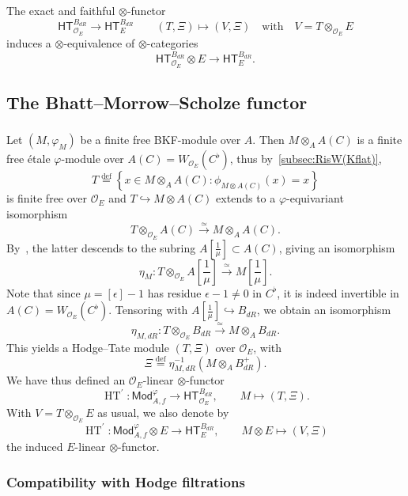 \documentclass[11pt]{article}
\theoremstyle{definition}
\numberwithin{equation}{section}
\numberwithin{figure}{section}
\numberwithin{table}{section}
\newcommand{\Mod}{\mathsf{Mod}}
\newcommand{\HT}{\mathsf{HT}}
\DeclareMathOperator{\HTT}{HT}
\newcommand{\eqd}{\stackrel{\mathrm{def}}{=}}
\newcommand*{\dR}{dR}
\begin{document}
The exact and faithful $\otimes$-functor
\[
\HT_{\mathcal{O}_{E}}^{B_{\dR}}\rightarrow\HT_{E}^{B_{\dR}}\qquad(T,\Xi)\mapsto(V,\Xi)\quad\text{with}\quad V=T\otimes_{\mathcal{O}_{E}}E
\]
induces a $\otimes$-equivalence of $\otimes$-categories
\[
\HT_{\mathcal{O}_{E}}^{B_{\dR}}\otimes E\rightarrow\HT_{E}^{B_{\dR}}.
\]


\subsection{The Bhatt--Morrow--Scholze functor}\label{subsec:The-Bhatt--Morrow--Scholze-functor}

\subsubsection{}

Let $(M,\varphi_{M})$ be a finite free BKF-module over $A$. Then $M\otimes_{A}A(C)$ is a finite free \'etale $\varphi$-module over $A(C)=W_{\mathcal{O}_{E}}(C^{\flat})$, thus by~\ref{subsec:RisW(Kflat)},
\[
T\eqd\left\{ x\in M\otimes_{A}A(C):\phi_{M\otimes A(C)}(x)=x\right\}
\]
is finite free over $\mathcal{O}_{E}$ and $T\hookrightarrow M\otimes A(C)$ extends to a $\varphi$-equivariant isomorphism
\[
T\otimes_{\mathcal{O}_{E}}A(C)\stackrel{\simeq}{\longrightarrow}M\otimes_{A}A(C).
\]
By~\cite[4.26]{BaMoSc16}, the latter descends to the subring $A[\frac{1}{\mu}]\subset A(C)$, giving an isomorphism
\[
\eta_{M}:T\otimes_{\mathcal{O}_{E}}A\!\left[\frac{1}{\mu}\right]\stackrel{\simeq}{\longrightarrow}M\!\left[\frac{1}{\mu}\right].
\]
Note that since $\mu=[\epsilon]-1$ has residue $\epsilon-1\neq0$ in $C^{\flat}$, it is indeed invertible in $A(C)=W_{\mathcal{O}_{E}}(C^{\flat})$. Tensoring with $A[\frac{1}{\mu}]\hookrightarrow B_{\dR}$, we obtain an isomorphism
\[
\eta_{M,\dR}:T\otimes_{\mathcal{O}_{E}}B_{\dR}\stackrel{\simeq}{\longrightarrow}M\otimes_{A}B_{\dR}.
\]
This yields a Hodge--Tate module $(T,\Xi)$ over $\mathcal{O}_{E}$, with
\[
\Xi\eqd\eta_{M,\dR}^{-1}(M\otimes_{A}B_{\dR}^{+}).
\]
We have thus defined an $\mathcal{O}_{E}$-linear $\otimes$-functor
\[
\HTT^{\prime}:\Mod_{A,f}^{\varphi}\rightarrow\HT_{\mathcal{O}_{E}}^{B_{\dR}},\qquad M\mapsto(T,\Xi).
\]
With $V=T\otimes_{\mathcal{O}_{E}}E$ as usual, we also denote by
\[
\HTT^{\prime}:\Mod_{A,f}^{\varphi}\otimes E\rightarrow\HT_{E}^{B_{\dR}},\qquad M\otimes E\mapsto(V,\Xi)
\]
the induced $E$-linear $\otimes$-functor.

\subsubsection{Compatibility with Hodge filtrations}
\end{document}
